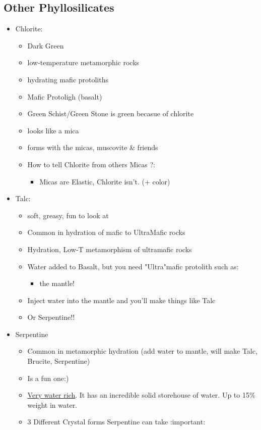 \documentclass[11pt]{article}
\begin{document}
\subsection{Other Phyllosilicates}
\label{sec-4-2}
\begin{itemize}
\item Chlorite:
\begin{itemize}
\item Dark Green
\item low-temperature metamorphic rocks
\item hydrating mafic protoliths
\item Mafic Protoligh (basalt)
\item Green Schist/Green Stone is green becasue of chlorite
\item looks like a mica
\item forms with the micas, muscovite \& friends
\item How to tell Chlorite from others Micas ?:
\begin{itemize}
\item Micas are Elastic, Chlorite isn't. (+ color)
\end{itemize}
\end{itemize}
\item Talc:
\begin{itemize}
\item soft, greasy, fun to look at
\item Common in hydration of mafic to UltraMafic rocks
\item Hydration, Low-T metamorphism of ultramafic rocks
\item Water added to Basalt, but you need "Ultra"mafic protolith such as:
\begin{itemize}
\item the mantle!
\end{itemize}
\item Inject water into the mantle and you'll make things like Talc
\item Or Serpentine!!
\end{itemize}
\item Serpentine
\begin{itemize}
\item Common in metamorphic hydration (add water to mantle, will make Talc, Brucite, Serpentine)
\item Is a fun one:)
\item \uline{Very water rich}. It has an incredible solid storehouse of water. Up to 15\% weight in water.
\item 3 Different Crystal forms Serpentine can take :important:

\end{itemize}
\end{itemize}
\end{document}
